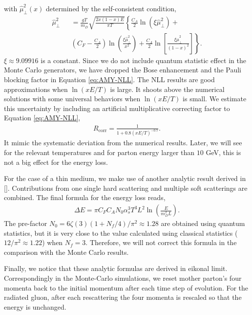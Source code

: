 \documentclass[aps, prc, reprint, amsmath, groupedaddress, nofootinbib]{revtex4-1}
\begin{document}
with $\hat{\mu}_\perp^2(x)$ determined by the self-consistent condition,
\begin{eqnarray}\label{eq:AMY-sf}
\nonumber
\hat{\mu}_\perp^2 && = \frac{gT}{m_D} \sqrt{\frac{2x(1-x)E}{\pi T}}\left\{\frac{C_A}{2}\ln(\xi\hat{\mu}_\perp^2) + \right. \\
&&\left.\left(C_F-\frac{C_A}{2}\right)\ln\left(\frac{\xi\hat{\mu}_\perp^2}{x^2}\right) + \frac{C_A}{2}\ln\left[\frac{\xi\hat{\mu}_\perp^2}{(1-x)^2}\right]\right\}.
\end{eqnarray}
$\xi\approx9.09916$ is a constant. Since we do not include quantum statistic effect in the Monte Carlo generators, we have dropped the Bose enhancement and the Pauli blocking factor in Equation \ref{eq:AMY-NLL}.
The NLL results are good approximations when $\ln(xE/T)$ is large. 
It shoots above the numerical solutions with some universal behaviors when $\ln(xE/T)$ is small.
We estimate this uncertainty by including an artificial multiplicative correcting factor to Equation \ref{eq:AMY-NLL}, 
\begin{eqnarray}
R_{\textrm{corr}} = \frac{1}{1+0.8\left(xE/T\right)^{-0.7}}.
\end{eqnarray}
It mimic the systematic deviation from the numerical results. 
Later, we will see for the relevant temperatures and for parton energy larger than $10$ GeV, this is not a big effect for the energy loss.

For the case of a thin medium, we make use of another analytic result derived in []. Contributions from one single hard scattering and multiple soft scatterings are combined. The final formula for the energy loss reads,
\begin{eqnarray}\label{eq:dE-thin}
\Delta E = \pi C_F C_A N_0 \alpha_s^3 T^3 L^2 \ln\left(\frac{E}{m_D^2 L}\right).
\end{eqnarray}
The pre-factor $N_0 = 6\zeta(3)(1+N_f/4)/\pi^2 \approx 1.28$ 
are obtained using quantum statistics, but it is very close to the value calculated using classical statistics ($12/\pi^2 \approx 1.22$) when $N_f=3$.
Therefore, we will not correct this formula in the comparison with the Monte Carlo results.

Finally, we notice that these analytic formulas are derived in eikonal limit. Correspondingly in the Monte-Carlo simulations, we reset mother parton's four momenta back to the initial momentum after each time step of evolution. For the radiated gluon, after each rescattering the four momenta is rescaled so that the energy is unchanged.
\end{document}

